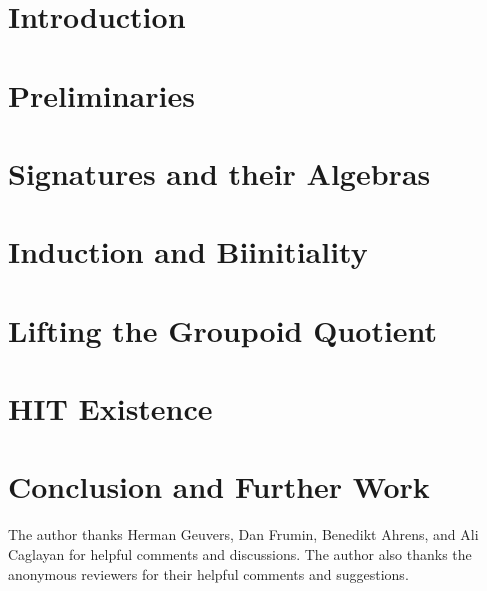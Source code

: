 \documentclass[screen]{acmart}
\theoremstyle{plain}
\theoremstyle{definition}
\begin{document}



\maketitle

\section{Introduction}


\section{Preliminaries}
\label{sec:prelims}


\section{Signatures and their Algebras}
\label{sec:signs}


\section{Induction and Biinitiality}
\label{sec:induction}


\section{Lifting the Groupoid Quotient}
\label{sec:biadj}


\section{HIT Existence}
\label{sec:existence}



\section{Conclusion and Further Work}
\label{sec:conclusion}



\begin{acks}
The author thanks Herman Geuvers, Dan Frumin, Benedikt Ahrens, and Ali Caglayan for helpful comments and discussions.
The author also thanks the anonymous reviewers for their helpful comments and suggestions.
\end{acks}



\end{document}
